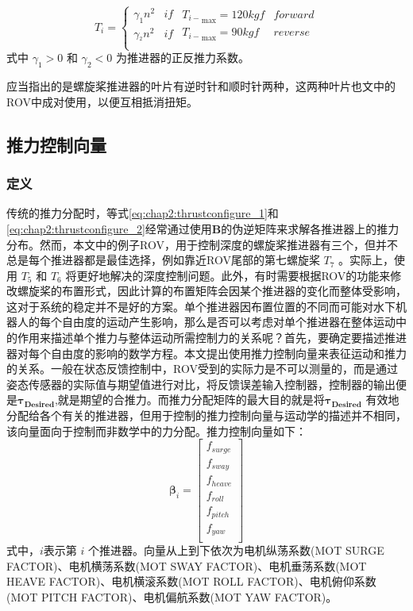 \begin{equation}
\label{eq:8}
{T_i} = \left\{ {\begin{array}{*{20}{c}}
   {{\gamma _1}{n^2}} & {if}  \\
   {{\gamma _{^2}}{n^2}} & {if}  \\
\end{array}} \right.\begin{array}{*{20}{c}}
   {{T_{i - }}_{\max } = 120kgf} & {forward}  \\
   {{T_{i - }}_{\max } = 90kgf } & {reverse}  \\
\end{array}
\end{equation}
式中 $\gamma _1 > 0$ 和 $\gamma _2 < 0$ 为推进器的正反推力系数。

应当指出的是螺旋桨推进器的叶片有逆时针和顺时针两种，这两种叶片也文中的ROV中成对使用，以便互相抵消扭矩。

\subsection{推力控制向量 }
\subsubsection{定义}
传统的推力分配时，等式\ref {eq:chap2:thrustconfigure_1}和\ref{eq:chap2:thrustconfigure_2}经常通过使用$\bm{B}$的伪逆矩阵来求解各推进器上的推力分布。然而，本文中的例子ROV，用于控制深度的螺旋桨推进器有三个，但并不总是每个推进器都是最佳选择，例如靠近ROV尾部的第七螺旋桨 $T_7$ 。实际上，使用 $T_5$ 和 $T_6$ 将更好地解决的深度控制问题。此外，有时需要根据ROV的功能来修改螺旋桨的布置形式，因此计算的布置矩阵会因某个推进器的变化而整体受影响，这对于系统的稳定并不是好的方案。单个推进器因布置位置的不同而可能对水下机器人的每个自由度的运动产生影响，那么是否可以考虑对单个推进器在整体运动中的作用来描述单个推力与整体运动所需控制力的关系呢？首先，要确定要描述推进器对每个自由度的影响的数学方程。本文提出使用推力控制向量来表征运动和推力的关系。一般在状态反馈控制中，ROV受到的实际力是不可以测量的，而是通过姿态传感器的实际值与期望值进行对比，将反馈误差输入控制器，控制器的输出便是$\bm{\tau_{Desired} }$,就是期望的合推力。而推力分配矩阵的最大目的就是将$\bm{\tau_{Desired} }$ 有效地分配给各个有关的推进器，但用于控制的推力控制向量与运动学的描述并不相同，该向量面向于控制而非数学中的力分配。推力控制向量如下\cite{ardupilot,ardusub}：
\begin{equation}
\label{eq:chap2:motor_factor}
\bm{\beta}_{i}=
\left[
\begin{array}{*{20}{c}}
  {f}_{surge}\\
  {f}_{sway}\\
  {f}_{heave}\\
  {f}_{roll}\\
  {f}_{pitch}\\
  {f}_{yaw}\\
\end{array}
\right]
\end{equation}
式中，$i$表示第 $i$ 个推进器。向量从上到下依次为电机纵荡系数(MOT SURGE FACTOR)、电机横荡系数(MOT SWAY FACTOR)、电机垂荡系数(MOT HEAVE FACTOR)、电机横滚系数(MOT ROLL FACTOR)、电机俯仰系数(MOT PITCH FACTOR)、电机偏航系数(MOT YAW FACTOR)。

